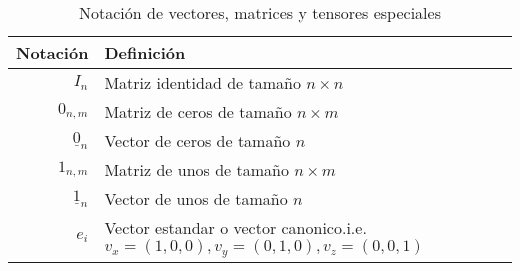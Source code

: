 \begin{table}[H]
    \begin{center}
        \begin{tabularx}{\textwidth}{|r|X|}
            \hline
            \textbf{Notación}     & \textbf{Definición}                                                                                                  \\
            \hline

            $ I_{n} $             & Matriz identidad de tamaño $ n \times n $                                                                            \\
            $ 0_{n,m} $           & Matriz de ceros de tamaño $ n \times m $                                                                             \\
            $ \underline{0}_{n} $ & Vector de ceros de tamaño $ n $                                                                                      \\
            $ 1_{n,m} $           & Matriz de unos de tamaño $ n \times m $                                                                              \\
            $ \underline{1}_{n} $ & Vector de unos de tamaño $n $                                                                                        \\
            $ e_{i} $             & Vector estandar o vector canonico.\newline i.e. \scriptsize{${ v_{x} = (1,0,0), v_{y} = (0,1,0), v_{z} = (0,0,1)} $} \\
            \hline
        \end{tabularx}
        \caption{Notación de vectores, matrices y tensores especiales}
        \label{tab:nnotation-part-v-2}
    \end{center}
\end{table}




